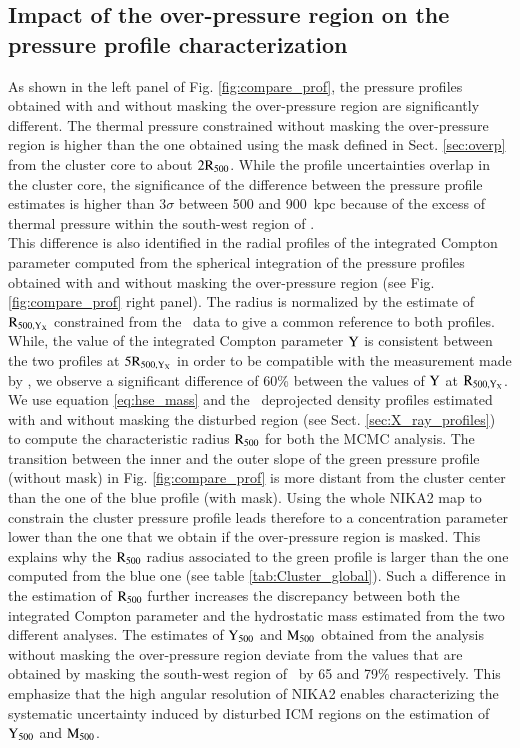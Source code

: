 \documentclass[traditabstract]{aa}
\begin{document}
\subsection{Impact of the over-pressure region on the pressure profile characterization}\label{sec:Impact_mass}

As shown in the left panel of Fig. \ref{fig:compare_prof}, the pressure profiles obtained with and without masking the over-pressure region are significantly different. The thermal pressure constrained without masking the over-pressure region is higher than the one obtained using the mask defined in Sect. \ref{sec:overp} from the cluster core to about $2\rm{R_{500}}$. While the profile uncertainties overlap in the cluster core, the significance of the difference between the pressure profile estimates is higher than $3\sigma$ between 500 and 900~kpc because of the excess of thermal pressure within the south-west region of \psz.\\
\indent This difference is also identified in the radial profiles of the integrated Compton parameter computed from the spherical integration of the pressure profiles obtained with and without masking the over-pressure region (see Fig. \ref{fig:compare_prof} right panel). The radius is normalized by the estimate of $\rm{R_{500,Y_X}}$ constrained from the \xmm\ data to give a common reference to both profiles. While, the value of the integrated Compton parameter $\rm{Y}$ is consistent between the two profiles at $5\rm{R_{500,Y_X}}$ in order to be compatible with the measurement made by \planck, we observe a significant difference of 60\% between the values of $\rm{Y}$ at $\rm{R_{500,Y_X}}$.\\
\indent We use equation \ref{eq:hse_mass} and the \xmm\ deprojected density profiles estimated with and without masking the disturbed region (see Sect. \ref{sec:X_ray_profiles}) to compute the characteristic radius $\rm{R_{500}}$ for both the MCMC analysis. The transition between the inner and the outer slope of the green pressure profile (without mask) in Fig. \ref{fig:compare_prof} is more distant from the cluster center than the one of the blue profile (with mask). Using the whole NIKA2 map to constrain the cluster pressure profile leads therefore to a concentration parameter lower than the one that we obtain if the over-pressure region is masked. This explains why the $\rm{R_{500}}$ radius associated to the green profile is larger than the one computed from the blue one (see table \ref{tab:Cluster_global}). Such a difference in the estimation of $\rm{R_{500}}$ further increases the discrepancy between both the integrated Compton parameter and the hydrostatic mass estimated from the two different analyses. The estimates of $\rm{Y_{500}}$ and $\rm{M_{500}}$ obtained from the analysis without masking the over-pressure region deviate from the values that are obtained by masking the south-west region of \psz\ by 65 and 79\% respectively. This emphasize that the high angular resolution of NIKA2 enables characterizing the systematic uncertainty induced by disturbed ICM regions on the estimation of $\rm{Y_{500}}$ and $\rm{M_{500}}$.\\
\end{document}
